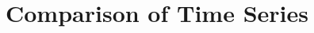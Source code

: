 \begin{figure}[hbt]
    \centering
        
    \caption{\resultsCaption{\toyota}}
    \label{fig:analysis-results-toyota}
\end{figure} 

\begin{figure}[hbt]
    \centering
        
    \caption{\resultsCaption{\vw}}
    \label{fig:analysis-results-vw}
\end{figure} 

\section{Comparison of Time Series}
\label{s:analysis-granger}

